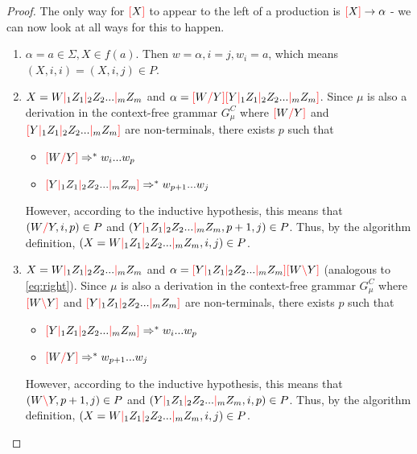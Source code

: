 \documentclass[12pt]{extarticle}
\theoremstyle{definition} \newtheorem{defn}{Definition}
\theoremstyle{definition} \newtheorem{prop}{Proposition}
\newcommand{\lc}{\textcolor{red}{\backslash}}
\newcommand{\rc}{\textcolor{red}{/}}
\newcommand{\mc}{\textcolor{red}{|}}
\newcommand{\lb}{\textcolor{red}{[}}
\newcommand{\rb}{\textcolor{red}{]}}
\begin{document}
\begin{proof}
    The only way for $\lb X \rb$ to appear to the left
    of a production is $\lb X \rb \rightarrow \alpha$ - we can now look at
    all ways for this to happen.
    \begin{enumerate}
        \item $\alpha = a \in \Sigma, X \in f(a)$. Then $w = \alpha, i = j, w_i = a$,
            which means $(X, i, i) = (X, i, j) \in P$.
        \item $X = W \mc_1 Z_1 \mc_2 Z_2 ... \mc_m Z_m$ and
            $\alpha = \lb W \rc Y \rb \lb Y \mc_1 Z_1 \mc_2 Z_2 ... \mc_m Z_m \rb$.
            Since $\mu$ is also a derivation in the context-free
            grammar $G^C_{\mu}$ where $\lb W \rc Y \rb$ and $\lb Y \mc_1 Z_1 \mc_2 Z_2 ... \mc_m Z_m \rb$
            are non-terminals, there exists $p$ such that
            \begin{itemize}
                \item $\lb W \rc Y \rb \Rightarrow^* w_i ... w_p$
                \item $\lb Y \mc_1 Z_1 \mc_2 Z_2 ... \mc_m Z_m \rb \Rightarrow^* w_{p+1} ... w_j$
            \end{itemize}
            However, according to the inductive hypothesis, this means that
            $(W \rc Y, i, p) \in P$ and
            $(Y \mc_1 Z_1 \mc_2 Z_2 ... \mc_m Z_m, p + 1, j) \in P$. Thus,
            by the algorithm definition,
            $(X = W \mc_1 Z_1 \mc_2 Z_2 ... \mc_m Z_m, i, j) \in P$.
        \item $X = W \mc_1 Z_1 \mc_2 Z_2 ... \mc_m Z_m$ and
            $\alpha = \lb Y \mc_1 Z_1 \mc_2 Z_2 ... \mc_m Z_m \rb \lb W \lc Y \rb$
            (analogous to \ref{eq:right}).
            Since $\mu$ is also a derivation in the context-free
            grammar $G^C_{\mu}$ where $\lb W \lc Y \rb$ and $\lb Y \mc_1 Z_1 \mc_2 Z_2 ... \mc_m Z_m \rb$
            are non-terminals, there exists $p$ such that
            \begin{itemize}
                \item $\lb Y \mc_1 Z_1 \mc_2 Z_2 ... \mc_m Z_m \rb \Rightarrow^* w_i ... w_p$
                \item $\lb W \rc Y \rb \Rightarrow^* w_{p + 1} ... w_j$
            \end{itemize}
            However, according to the inductive hypothesis, this means that
            $(W \lc Y, p + 1, j) \in P$ and
            $(Y \mc_1 Z_1 \mc_2 Z_2 ... \mc_m Z_m, i, p) \in P$. Thus,
            by the algorithm definition,
            $(X = W \mc_1 Z_1 \mc_2 Z_2 ... \mc_m Z_m, i, j) \in P$.
    \end{enumerate}

\end{proof}
\end{document}

